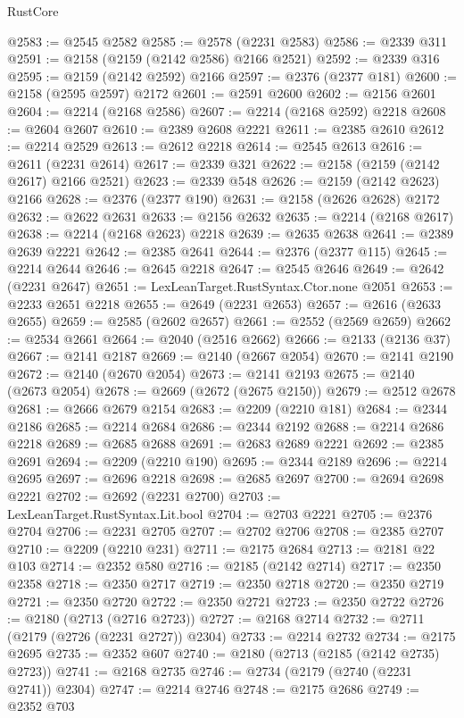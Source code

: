 \begin{lexlean}{RustCore}
\begin{coremodule}
@2583 := @2545 @2582
@2585 := @2578 (@2231 @2583)
@2586 := @2339 @311
@2591 := @2158 (@2159 (@2142 @2586) @2166 @2521)
@2592 := @2339 @316
@2595 := @2159 (@2142 @2592) @2166
@2597 := @2376 (@2377 @181)
@2600 := @2158 (@2595 @2597) @2172
@2601 := @2591 @2600
@2602 := @2156 @2601
@2604 := @2214 (@2168 @2586)
@2607 := @2214 (@2168 @2592) @2218
@2608 := @2604 @2607
@2610 := @2389 @2608 @2221
@2611 := @2385 @2610
@2612 := @2214 @2529
@2613 := @2612 @2218
@2614 := @2545 @2613
@2616 := @2611 (@2231 @2614)
@2617 := @2339 @321
@2622 := @2158 (@2159 (@2142 @2617) @2166 @2521)
@2623 := @2339 @548
@2626 := @2159 (@2142 @2623) @2166
@2628 := @2376 (@2377 @190)
@2631 := @2158 (@2626 @2628) @2172
@2632 := @2622 @2631
@2633 := @2156 @2632
@2635 := @2214 (@2168 @2617)
@2638 := @2214 (@2168 @2623) @2218
@2639 := @2635 @2638
@2641 := @2389 @2639 @2221
@2642 := @2385 @2641
@2644 := @2376 (@2377 @115)
@2645 := @2214 @2644
@2646 := @2645 @2218
@2647 := @2545 @2646
@2649 := @2642 (@2231 @2647)
@2651 := LexLeanTarget.RustSyntax.Ctor.none @2051
@2653 := @2233 @2651 @2218
@2655 := @2649 (@2231 @2653)
@2657 := @2616 (@2633 @2655)
@2659 := @2585 (@2602 @2657)
@2661 := @2552 (@2569 @2659)
@2662 := @2534 @2661
@2664 := @2040 (@2516 @2662)
@2666 := @2133 (@2136 @37)
@2667 := @2141 @2187
@2669 := @2140 (@2667 @2054)
@2670 := @2141 @2190
@2672 := @2140 (@2670 @2054)
@2673 := @2141 @2193
@2675 := @2140 (@2673 @2054)
@2678 := @2669 (@2672 (@2675 @2150))
@2679 := @2512 @2678
@2681 := @2666 @2679 @2154
@2683 := @2209 (@2210 @181)
@2684 := @2344 @2186
@2685 := @2214 @2684
@2686 := @2344 @2192
@2688 := @2214 @2686 @2218
@2689 := @2685 @2688
@2691 := @2683 @2689 @2221
@2692 := @2385 @2691
@2694 := @2209 (@2210 @190)
@2695 := @2344 @2189
@2696 := @2214 @2695
@2697 := @2696 @2218
@2698 := @2685 @2697
@2700 := @2694 @2698 @2221
@2702 := @2692 (@2231 @2700)
@2703 := LexLeanTarget.RustSyntax.Lit.bool
@2704 := @2703 @2221
@2705 := @2376 @2704
@2706 := @2231 @2705
@2707 := @2702 @2706
@2708 := @2385 @2707
@2710 := @2209 (@2210 @231)
@2711 := @2175 @2684
@2713 := @2181 @22 @103
@2714 := @2352 @580
@2716 := @2185 (@2142 @2714)
@2717 := @2350 @2358
@2718 := @2350 @2717
@2719 := @2350 @2718
@2720 := @2350 @2719
@2721 := @2350 @2720
@2722 := @2350 @2721
@2723 := @2350 @2722
@2726 := @2180 (@2713 (@2716 @2723))
@2727 := @2168 @2714
@2732 := @2711 (@2179 (@2726 (@2231 @2727)) @2304)
@2733 := @2214 @2732
@2734 := @2175 @2695
@2735 := @2352 @607
@2740 := @2180 (@2713 (@2185 (@2142 @2735) @2723))
@2741 := @2168 @2735
@2746 := @2734 (@2179 (@2740 (@2231 @2741)) @2304)
@2747 := @2214 @2746
@2748 := @2175 @2686
@2749 := @2352 @703

\end{coremodule}
\end{lexlean}
